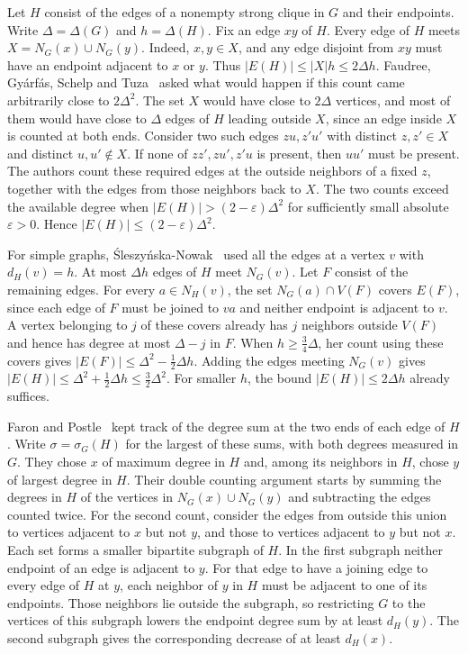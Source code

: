 \documentclass[preprint,11pt,numbers]{elsarticle-arxiv}
\numberwithin{equation}{section}
\theoremstyle{definition}
\begin{document}
Let $H$ consist of the edges of a nonempty strong clique in $G$ and
their endpoints. Write $\Delta=\Delta(G)$ and $h=\Delta(H)$. Fix an
edge $xy$ of $H$. Every edge of $H$ meets $X=N_G(x)\cup N_G(y)$.
Indeed, $x,y\in X$, and any edge disjoint from $xy$ must have an
endpoint adjacent to $x$ or $y$. Thus $|E(H)|\leq |X|h\leq2\Delta h$.
Faudree, Gy\'arf\'as, Schelp and Tuza~\cite{FGST1990} asked what
would happen if this count came arbitrarily close to $2\Delta^2$.
The set $X$ would have close to $2\Delta$ vertices, and most of them
would have close to $\Delta$ edges of $H$ leading outside $X$, since
an edge inside $X$ is counted at both ends. Consider two such edges
$zu,z'u'$ with distinct $z,z'\in X$ and distinct $u,u'\notin X$.
If none of $zz',zu',z'u$ is present, then $uu'$ must be present.
The authors count these required edges at the outside neighbors of
a fixed $z$, together with the edges from those neighbors back to
$X$. The two counts exceed the available degree when
$|E(H)|>(2-\varepsilon)\Delta^2$ for sufficiently small absolute
$\varepsilon>0$. Hence $|E(H)|\leq(2-\varepsilon)\Delta^2$.

For simple graphs, \'{S}leszy\'{n}ska-Nowak~\cite{SleszynskaNowak2016}
used all the edges at a vertex $v$ with $d_H(v)=h$. At most $\Delta h$
edges of $H$ meet $N_G(v)$. Let $F$ consist of the remaining edges.
For every $a\in N_H(v)$, the set $N_G(a)\cap V(F)$ covers $E(F)$,
since each edge of $F$ must be joined to $va$ and neither endpoint is
adjacent to $v$. A vertex belonging to $j$ of these covers already
has $j$ neighbors outside $V(F)$ and hence has degree at most
$\Delta-j$ in $F$. When $h\geq\frac{3}{4}\Delta$, her count using
these covers gives $|E(F)|\leq\Delta^2-\frac{1}{2}\Delta h$.
Adding the edges meeting $N_G(v)$ gives
$|E(H)|\leq\Delta^2+\frac{1}{2}\Delta h\leq\frac{3}{2}\Delta^2$.
For smaller $h$, the bound $|E(H)|\leq2\Delta h$ already suffices.

Faron and Postle~\cite{FaronPostle2019} kept track of the degree sum
at the two ends of each edge of $H$. Write $\sigma=\sigma_G(H)$ for
the largest of these sums, with both degrees measured in $G$.
They chose $x$ of maximum degree in $H$ and, among its neighbors
in $H$, chose $y$ of largest degree in $H$. Their double counting
argument starts by summing the degrees in $H$ of the vertices in
$N_G(x)\cup N_G(y)$ and subtracting the edges counted twice.
For the second count, consider the edges from outside this union to
vertices adjacent to $x$ but not $y$, and those to vertices adjacent
to $y$ but not $x$. Each set forms a
smaller bipartite subgraph of $H$. In the first subgraph neither
endpoint of an edge is adjacent to $y$. For that edge to have a
joining edge to every edge of $H$ at $y$, each neighbor of $y$ in
$H$ must be adjacent to one of its endpoints. Those neighbors lie outside
the subgraph, so restricting $G$ to the vertices of this subgraph
lowers the endpoint degree sum by at least $d_H(y)$. The second
subgraph gives the corresponding decrease of at least $d_H(x)$.
\end{document}
